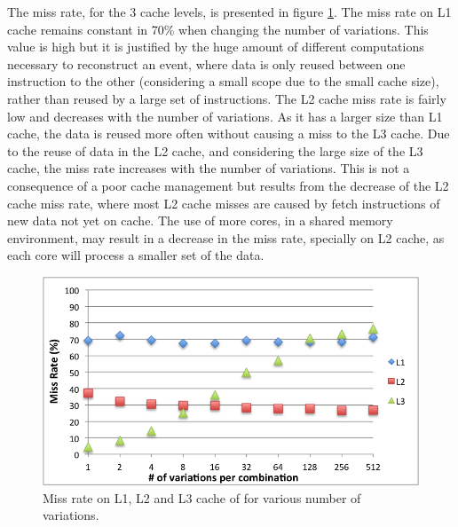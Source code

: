 The miss rate, for the 3 cache levels, is presented in figure \ref{fig:MissRate}. The miss rate on L1 cache remains constant in 70\% when changing the number of variations. This value is high but it is justified by the huge amount of different computations necessary to reconstruct an event, where data is only reused between one instruction to the other (considering a small scope due to the small cache size), rather than reused by a large set of instructions. The L2 cache miss rate is fairly low and decreases with the number of variations. As it has a larger size than L1 cache, the data is reused more often without causing a miss to the L3 cache. Due to the reuse of data in the L2 cache, and considering the large size of the L3 cache, the miss rate increases with the number of variations. This is not a consequence of a poor cache management but results from the decrease of the L2 cache miss rate, where most L2 cache misses are caused by fetch instructions of new data not yet on cache. The use of more cores, in a shared memory environment, may result in a decrease in the miss rate, specially on L2 cache, as each core will process a smaller set of the data.

\begin{figure}[!htp]
	\begin{center}
		\includegraphics[scale=0.8]{../../common/graphs/miss_rate.png}  
		\caption{Miss rate on L1, L2 and L3 cache of \ttDilepKinFit for various number of variations.}
		\label{fig:MissRate}
	\end{center}
\end{figure}

